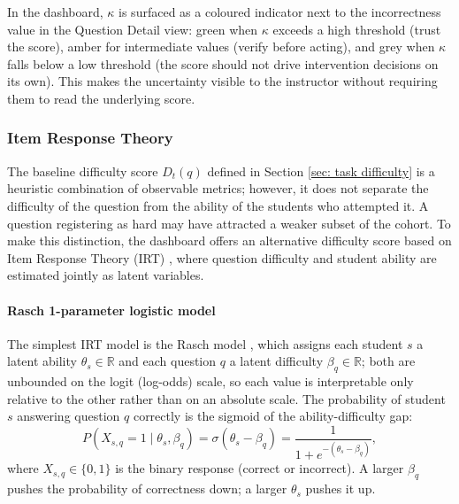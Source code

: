 In the dashboard, $\kappa$ is surfaced as a coloured indicator next to the incorrectness value in the Question Detail view: green when $\kappa$ exceeds a high threshold (trust the score), amber for intermediate values (verify before acting), and grey when $\kappa$ falls below a low threshold (the score should not drive intervention decisions on its own). This makes the uncertainty visible to the instructor without requiring them to read the underlying score.


\subsubsection{Item Response Theory}  \label{sec: irt}
The baseline difficulty score $D_t(q)$ defined in Section \ref{sec: task difficulty} is a heuristic combination of observable metrics; however, it does not separate the difficulty of the question from the ability of the students who attempted it. A question registering as hard may have attracted a weaker subset of the cohort. To make this distinction, the dashboard offers an alternative difficulty score based on Item Response Theory (IRT) \cite{lord1968statistical}, where question difficulty and student ability are estimated jointly as latent variables.

\paragraph{Rasch 1-parameter logistic model}
The simplest IRT model is the Rasch model \cite{rasch1960probabilistic}, which assigns each student $s$ a latent ability $\theta_s \in \mathbb{R}$ and each question $q$ a latent difficulty $\beta_q \in \mathbb{R}$; both are unbounded on the logit (log-odds) scale, so each value is interpretable only relative to the other rather than on an absolute scale. The probability of student $s$ answering question $q$ correctly is the sigmoid of the ability-difficulty gap:
\begin{equation}
    P(X_{s,q} = 1 \mid \theta_s, \beta_q)
    = \sigma(\theta_s - \beta_q)
    = \frac{1}{1 + e^{-(\theta_s - \beta_q)}},
    \label{eq:rasch-1pl}
\end{equation}
where $X_{s,q} \in \{0, 1\}$ is the binary response (correct or incorrect). 
A larger $\beta_q$ pushes the probability of correctness down; a larger $\theta_s$ pushes it up.

